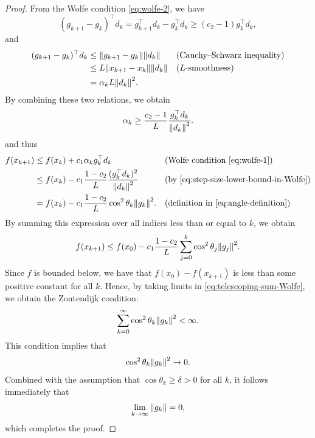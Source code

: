 \documentclass[en]{subfiles}
\begin{document}
\begin{proof}
    From the Wolfe condition \eqref{eq:wolfe-2}, we have
    \begin{equation*}
        (g_{k+1} - g_k)^\top d_k
        = g_{k+1}^\top d_k - g_k^\top d_k
        \geq (c_2 - 1) g_k^\top d_k,
    \end{equation*}
    and
    \begin{align*}
        (g_{k+1} - g_k)^\top d_k        & \leq
        \norm{g_{k+1} - g_k} \norm{d_k} &                                        & \text{(Cauchy--Schwarz inequality)}                           \\
                                        & \leq L \norm{x_{k+1} - x_k} \norm{d_k} &                                     & \text{($L$-smoothness)} \\
                                        & = \alpha_k L \norm{d_k}^2.
    \end{align*}
    By combining these two relations, we obtain
    \begin{equation}\label{eq:step-size-lower-bound-in-Wolfe}
        \alpha_k \geq \frac{c_2 - 1}{L} \frac{g_k^\top d_k}{\norm{d_k}^2}.
    \end{equation}
    and thus
    \begin{align*}
        f(x_{k+1}) & \leq f(x_k) + c_1 \alpha_k g_k^\top d_k                                   &  & \text{(Wolfe condition \eqref{eq:wolfe-1})}           \\
                   & \leq f(x_k) - c_1 \frac{1 - c_2}{L} \frac{(g_k^\top d_k)^2}{\norm{d_k}^2} &  & \text{(by \eqref{eq:step-size-lower-bound-in-Wolfe})} \\
                   & = f(x_k) - c_1 \frac{1 - c_2}{L} \cos^2 \theta_k \norm{g_k}^2.            &  & \text{(definition in \eqref{eq:angle-definition})}
    \end{align*}
    By summing this expression over all indices less than or equal to $k$, we obtain
    \begin{equation}\label{eq:telescoping-sum-Wolfe}
        f(x_{k+1}) \leq f(x_0) - c_1 \frac{1 - c_2}{L} \sum_{j=0}^k \cos^2 \theta_j \norm{g_j}^2.
    \end{equation}
    Since $f$ is bounded below, we have that $f(x_0) - f(x_{k+1})$ is less than some positive constant for all $k$.
    Hence, by taking limits in \eqref{eq:telescoping-sum-Wolfe}, we obtain the Zoutendijk condition:
    \begin{equation}\label{eq:zoutendijk}
        \sum_{k=0}^\infty \cos^2 \theta_k \norm{g_k}^2 < \infty.
    \end{equation}
    This condition implies that
    \begin{equation*}
        \cos^2 \theta_k \norm{g_k}^2 \to 0.
    \end{equation*}
    Combined with the assumption that $\cos \theta_k \geq \delta > 0$ for all $k$, it follows immediately that
    \begin{equation*}
        \lim_{k \to \infty} \norm{g_k} = 0,
    \end{equation*}
    which completes the proof.
\end{proof}
\end{document}

